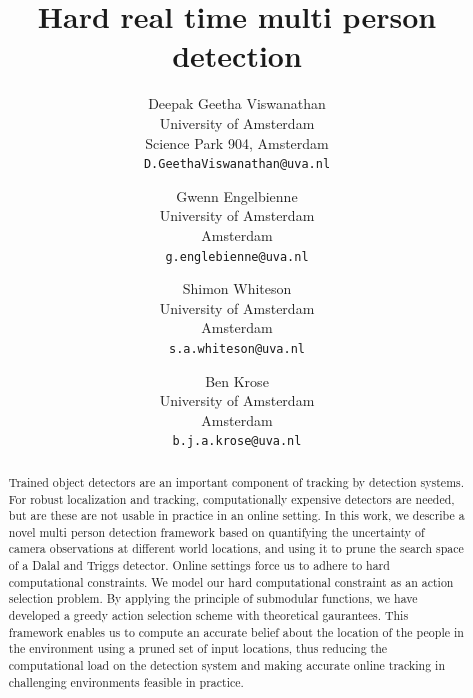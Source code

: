\documentclass[10pt,twocolumn,letterpaper]{article}
\begin{document}
\title{Hard real time multi person detection}

\author{Deepak Geetha Viswanathan\\
University of Amsterdam\\
Science Park 904, Amsterdam\\
{\tt\small D.GeethaViswanathan@uva.nl}
\and
Gwenn Engelbienne\\
University of Amsterdam\\
Amsterdam\\
{\tt\small g.englebienne@uva.nl}
\and
Shimon Whiteson\\
University of Amsterdam\\
Amsterdam\\
{\tt\small s.a.whiteson@uva.nl}
\and
Ben Krose\\
University of Amsterdam\\
Amsterdam\\
{\tt\small b.j.a.krose@uva.nl}
}

\maketitle


\begin{abstract}
Trained object detectors are an important component of tracking by detection systems. For robust localization and tracking, computationally expensive detectors are needed, but are these are not usable in practice in an online setting.  In this work, we describe a novel multi person detection framework based on quantifying the uncertainty of camera observations at different world locations, and using it to prune the search space of a Dalal and Triggs detector. Online settings force us to adhere to hard computational constraints. We model our hard computational constraint as an action selection problem. By applying the principle of submodular functions, we have developed a greedy action selection scheme with theoretical gaurantees. This framework enables us to compute an accurate belief about the location of the people in the environment using a pruned set of input locations, thus reducing the computational load on the detection system and making accurate online tracking in challenging environments feasible in practice.
\end{abstract}
\end{document}

